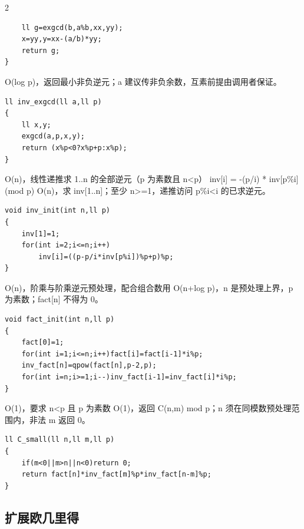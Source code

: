 \documentclass[UTF8,fontset=fandol,a4paper,twoside]{ctexart}
\newcommand{\note}[1]{{\fontsize{10}{12}\selectfont #1\par}}
\begin{document}
\begin{multicols}{2}
\begin{lstlisting}
    ll g=exgcd(b,a%b,xx,yy);
    x=yy,y=xx-(a/b)*yy;
    return g;
}
\end{lstlisting}
\note{O(\allowbreak{}log p)\allowbreak{}，返回最小非负逆元；a 建议传非负余数，互素前提由调用者保证。}
\begin{lstlisting}
ll inv_exgcd(ll a,ll p)
{
    ll x,y;
    exgcd(a,p,x,y);
    return (x%p<0?x%p+p:x%p);
}
\end{lstlisting}
\note{O(\allowbreak{}n)\allowbreak{}，线性递推求 1.\allowbreak{}.\allowbreak{}n 的全部逆元（p 为素数且 n<\allowbreak{}p） inv[\allowbreak{}i]\allowbreak{} =\allowbreak{} -\allowbreak{}(\allowbreak{}p/\allowbreak{}i)\allowbreak{} * inv[\allowbreak{}p\%i]\allowbreak{} (\allowbreak{}mod p)\allowbreak{} O(\allowbreak{}n)\allowbreak{}，求 inv[\allowbreak{}1.\allowbreak{}.\allowbreak{}n]\allowbreak{}；至少 n>\allowbreak{}=\allowbreak{}1，递推访问 p\%i<\allowbreak{}i 的已求逆元。}
\begin{lstlisting}
void inv_init(int n,ll p)
{
    inv[1]=1;
    for(int i=2;i<=n;i++)
        inv[i]=((p-p/i*inv[p%i])%p+p)%p;
}
\end{lstlisting}
\note{O(\allowbreak{}n)\allowbreak{}，阶乘与阶乘逆元预处理，配合组合数用 O(\allowbreak{}n+\allowbreak{}log p)\allowbreak{}，n 是预处理上界，p 为素数；fact[\allowbreak{}n]\allowbreak{} 不得为 0。}
\begin{lstlisting}
void fact_init(int n,ll p)
{
    fact[0]=1;
    for(int i=1;i<=n;i++)fact[i]=fact[i-1]*i%p;
    inv_fact[n]=qpow(fact[n],p-2,p);
    for(int i=n;i>=1;i--)inv_fact[i-1]=inv_fact[i]*i%p;
}
\end{lstlisting}
\note{O(\allowbreak{}1)\allowbreak{}，要求 n<\allowbreak{}p 且 p 为素数 O(\allowbreak{}1)\allowbreak{}，返回 C(\allowbreak{}n,\allowbreak{}m)\allowbreak{} mod p；n 须在同模数预处理范围内，非法 m 返回 0。}
\begin{lstlisting}
ll C_small(ll n,ll m,ll p)
{
    if(m<0||m>n||n<0)return 0;
    return fact[n]*inv_fact[m]%p*inv_fact[n-m]%p;
}
\end{lstlisting}
\subsection{扩展欧几里得}


\end{multicols}
\end{document}
